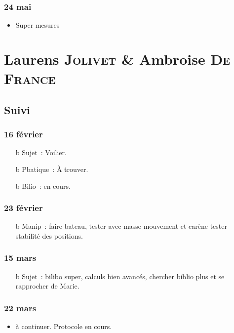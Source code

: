 \documentclass[a4paper, 11pt, final, garamond]{book}
\begin{document}
\subsection{24 mai}
\begin{itemize}
	\item Super mesures
\end{itemize}

\chapter{Laurens \textsc{Jolivet} \& Ambroise \textsc{De France}}
\label{ch:jolivetdefrance}

\section{Suivi}
\subsection{16 février}
\begin{itemize}
	\item[b]{Sujet}~: Voilier.
	\item[b]{Pbatique}~: À trouver.
	\item[b]{Bilio}~: en cours.
\end{itemize}

\subsection{23 février}
\begin{itemize}
	\item[b]{Manip}~: faire bateau, tester avec masse mouvement et carène tester
	stabilité des positions.
\end{itemize}

\subsection{15 mars}
\begin{itemize}
	\item[b]{Sujet}~: bilibo super, calculs bien avancés, chercher biblio plus et se
	rapprocher de Marie.
\end{itemize}

\subsection{22 mars}
\begin{itemize}
	\item à continuer. Protocole en cours.
\end{itemize}
\end{document}
